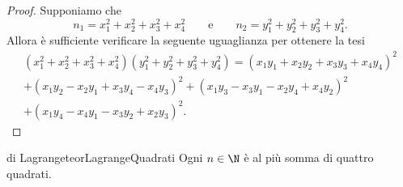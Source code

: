 \begin{proof}
	Supponiamo che
	\[
		n_1 = x_1^2 + x_2^2 + x_3^2 + x_4^2 \qquad\text{e}\qquad n_2 = y_1^2 + y_2^2 + y_3^2 + y_4^2.
	\]
	Allora è sufficiente verificare la seguente uguaglianza per ottenere la tesi
	\begin{multline*}
		(x_1^2 + x_2^2 + x_3^2 + x_4^2)(y_1^2 + y_2^2 + y_3^2 + y_4^2) = (x_1 y_1+x_2 y_2+x_3 y_3+x_4 y_4)^2\\
		+ (x_1 y_2-x_2 y_1+x_3 y_4-x_4y_3)^2 + (x_1 y_3 - x_3 y_1 - x_2 y_4 + x_4 y_2)^2\\
		+ (x_1 y_4 - x_4 y_1 - x_3 y_2 + x_2 y_3)^2.
	\end{multline*}
\end{proof}

\begin{teor}{di Lagrange}{teorLagrangeQuadrati}
	Ogni \(n\in\N\) è al più somma di quattro quadrati.
\end{teor}

